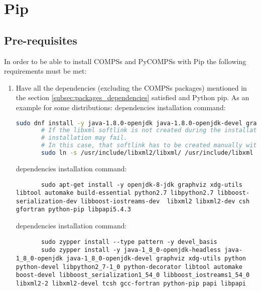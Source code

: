 \section{Pip}
\label{sec:Pip}

\subsection{Pre-requisites}
\label{subsec:pip_prerequisites}
In order to be able to install COMPSs and PyCOMPSs with Pip the following requirements must be met:
\begin{enumerate}
 \item Have all the dependencies (excluding the COMPSs packages) mentioned in the section \ref{subsec:packages_dependencies} satisfied and Python pip.
 As an example for some distributions:
    dependencies installation command:
     \begin{lstlisting}[language=bash]
       sudo dnf install -y java-1.8.0-openjdk java-1.8.0-openjdk-devel graphviz xdg-utils libtool automake python python-libs python-pip python-devel python2-decorator boost-devel boost-serialization boost-iostreams libxml2 libxml2-devel gcc gcc-c++ gcc-gfortran tcsh @development-tools redhat-rpm-config papi
       # If the libxml softlink is not created during the installation of libxml2, the COMPSs
       # installation may fail.
       # In this case, that softlink has to be created manually with the following command:
       sudo ln -s /usr/include/libxml2/libxml/ /usr/include/libxml
     \end{lstlisting}
    dependencies installation command:
     \begin{lstlisting}
       sudo apt-get install -y openjdk-8-jdk graphviz xdg-utils libtool automake build-essential python2.7 libpython2.7 libboost-serialization-dev libboost-iostreams-dev  libxml2 libxml2-dev csh gfortran python-pip libpapi5.4.3
     \end{lstlisting}
    dependencies installation command:
     \begin{lstlisting}
       sudo zypper install --type pattern -y devel_basis
       sudo zypper install -y java-1_8_0-openjdk-headless java-1_8_0-openjdk java-1_8_0-openjdk-devel graphviz xdg-utils python python-devel libpython2_7-1_0 python-decorator libtool automake  boost-devel libboost_serialization1_54_0 libboost_iostreams1_54_0  libxml2-2 libxml2-devel tcsh gcc-fortran python-pip papi libpapi
     \end{lstlisting}

\end{enumerate}
